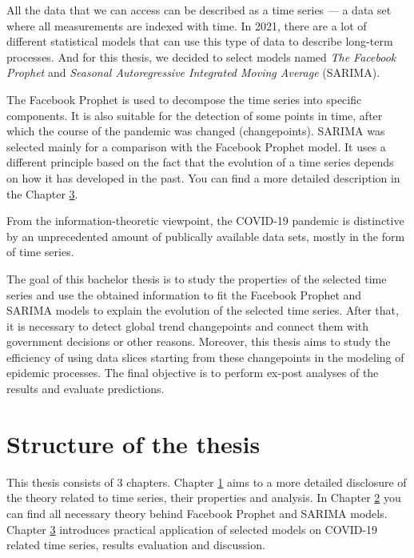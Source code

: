 All the data that we can access can be described as a time series — a data set where all measurements are indexed with time. In 2021, there are a lot of different statistical models that can use this type of data to describe long-term processes. And for this thesis, we decided to select models named \textit{The Facebook Prophet} and \textit{Seasonal Autoregressive Integrated Moving Average} (SARIMA).

The Facebook Prophet is used to decompose the time series into specific components. It is also suitable for the detection of some points in time, after which the course of the pandemic was changed (changepoints). SARIMA was selected mainly for a comparison with the Facebook Prophet model. It uses a different principle based on the fact that the evolution of a time series depends on how it has developed in the past. You can find a more detailed description in the Chapter \hyperlink{ch3}{3}.

From the information-theoretic viewpoint, the COVID-19 pandemic is distinctive by an unprecedented amount of publically available data sets, mostly in the form of time series. 

The goal of this bachelor thesis is to study the properties of the selected time series and use the obtained information to fit the Facebook Prophet and SARIMA models to explain the evolution of the selected time series. After that, it is necessary to detect global trend changepoints and connect them with government decisions or other reasons. Moreover, this thesis aims to study the efficiency of using data slices starting from these changepoints in the modeling of epidemic processes. The final objective is to perform ex-post analyses of the results and evaluate predictions.

\section{Structure of the thesis}

This thesis consists of 3 chapters. Chapter \hyperlink{ch1}{1} aims to a more detailed disclosure of the theory related to time series, their properties and analysis. In Chapter \hyperlink{ch2}{2} you can find all necessary theory behind Facebook Prophet and SARIMA models. Chapter \hyperlink{ch3}{3} introduces practical application of selected models on COVID-19 related time series, results evaluation and discussion. 